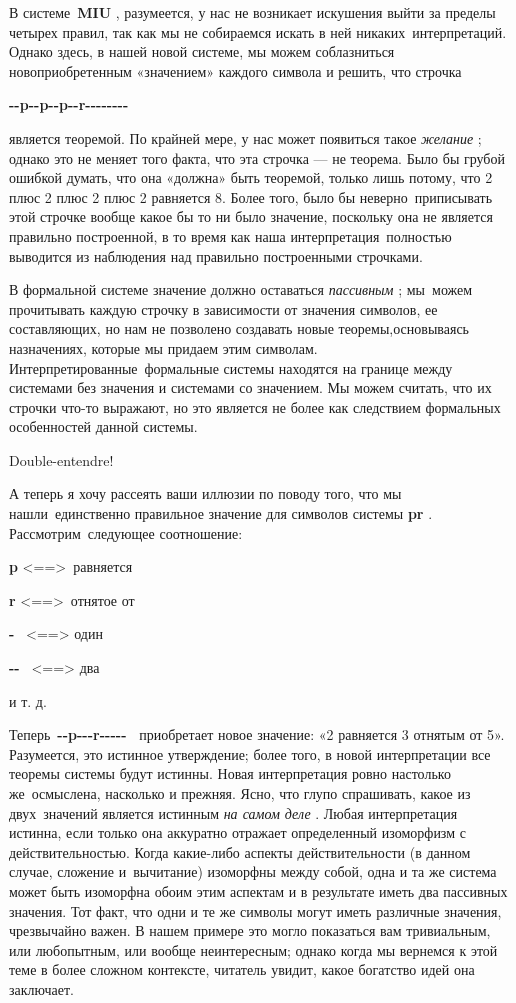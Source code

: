 В системе~\textbf{MIU} , разумеется, у нас не возникает искушения выйти за пределы четырех правил, так как мы не собираемся искать в ней никаких~интерпретаций. Однако здесь, в нашей новой системе, мы можем соблазниться новоприобретенным «значением» каждого символа и решить, что строчка

\textbf{-\/-p-\/-p-\/-p-\/-r-\/-\/-\/-\/-\/-\/-\/-}

является теоремой. По крайней мере, у нас может появиться такое \emph{желание} ; однако это не меняет того факта, что эта строчка --- не теорема. Было бы грубой ошибкой думать, что она «должна» быть теоремой, только лишь потому, что 2 плюс 2 плюс 2 плюс 2 равняется 8. Более того, было бы неверно~приписывать этой строчке вообще какое бы то ни было значение, поскольку она не является правильно построенной, в то время как наша интерпретация~полностью выводится из наблюдения над правильно построенными строчками.

В формальной системе значение должно оставаться \emph{пассивным} ; мы~можем прочитывать каждую строчку в зависимости от значения символов, ее составляющих, но нам не позволено создавать новые теоремы,основываясь назначениях, которые мы придаем этим символам. Интерпретированные~формальные системы находятся на границе между системами без значения и системами со значением. Мы можем считать, что их строчки что-то выражают, но это является не более как следствием формальных особенностей данной системы.

Double-entendre!

А теперь я хочу рассеять ваши иллюзии по поводу того, что мы нашли~единственно правильное значение для символов системы \textbf{pr} . Рассмотрим~следующее соотношение:

\textbf{p} \textless==\textgreater~равняется

\textbf{r} \textless==\textgreater~отнятое от

\textbf{-} ~\textless==\textgreater{} один

\textbf{-\/-} ~\textless==\textgreater{} два

и т. д.

Теперь~\textbf{-\/-p-\/-\/-r-\/-\/-\/-\/-~} приобретает новое значение: «2 равняется 3 отнятым от 5». Разумеется, это истинное утверждение; более того, в новой интерпретации все теоремы системы будут истинны. Новая интерпретация ровно настолько же~осмыслена, насколько и прежняя. Ясно, что глупо спрашивать, какое из двух~значений является истинным \emph{на самом деле} . Любая интерпретация истинна, если только она аккуратно отражает определенный изоморфизм с действительностью. Когда какие-либо аспекты действительности (в данном случае, сложение и~вычитание) изоморфны между собой, одна и та же система может быть изоморфна обоим этим аспектам и в результате иметь два пассивных значения. Тот факт, что одни и те же символы могут иметь различные значения, чрезвычайно важен. В нашем примере это могло показаться вам тривиальным, или любопытным, или вообще неинтересным; однако когда мы вернемся к этой теме в более сложном контексте, читатель увидит, какое богатство идей она заключает.


